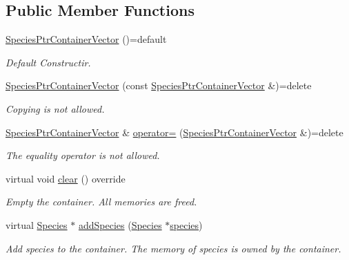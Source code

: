 \subsection*{Public Member Functions}
\begin{DoxyCompactItemize}
\item 
\hyperlink{classSpeciesPtrContainerVector_a398eb128b04d3ec68c3cedbd0671e0f9}{Species\+Ptr\+Container\+Vector} ()=default
\begin{DoxyCompactList}\small\item\em Default Constructir. \end{DoxyCompactList}\item 
\hyperlink{classSpeciesPtrContainerVector_a3f622097f66c6ba836409f4ee0548268}{Species\+Ptr\+Container\+Vector} (const \hyperlink{classSpeciesPtrContainerVector}{Species\+Ptr\+Container\+Vector} \&)=delete
\begin{DoxyCompactList}\small\item\em Copying is not allowed. \end{DoxyCompactList}\item 
\hyperlink{classSpeciesPtrContainerVector}{Species\+Ptr\+Container\+Vector} \& \hyperlink{classSpeciesPtrContainerVector_ae953a376c2d45174fada0d77689c5a9f}{operator=} (\hyperlink{classSpeciesPtrContainerVector}{Species\+Ptr\+Container\+Vector} \&)=delete
\begin{DoxyCompactList}\small\item\em The equality operator is not allowed. \end{DoxyCompactList}\item 
virtual void \hyperlink{classSpeciesPtrContainerVector_a72b7289c2611d82e18b32fbb4a569b4b}{clear} () override
\begin{DoxyCompactList}\small\item\em Empty the container. All memories are freed. \end{DoxyCompactList}\item 
virtual \hyperlink{classSpecies}{Species} $\ast$ \hyperlink{classSpeciesPtrContainerVector_a5e34bc3ef8140dfa460c4ea2e9754bd1}{add\+Species} (\hyperlink{classSpecies}{Species} $\ast$\hyperlink{classSpeciesPtrContainerVector_a9ce8b3b4f9a170def9d758d4286e0d3e}{species})
\begin{DoxyCompactList}\small\item\em Add species to the container. The memory of species is owned by the container. \end{DoxyCompactList}\item 

\end{DoxyCompactItemize}
